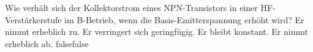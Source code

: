     {Wie verhält sich der Kollektorstrom eines NPN-Transistors in einer HF-Verstärkerstufe im B-Betrieb, wenn die Basis-Emitterspannung erhöht wird?}
    {Er nimmt erheblich zu.}
    {Er verringert sich geringfügig.}
    {Er bleibt konstant.}
    {Er nimmt erheblich ab.}
    {false}{false}